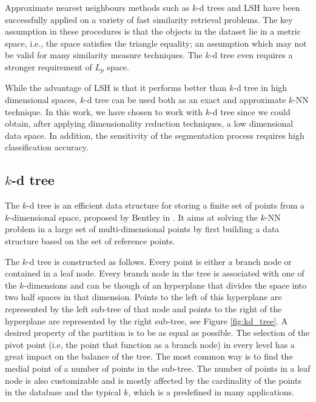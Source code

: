 \iftoggle{edit-mode}{\hspace{0pt}\marginpar{Examples of Exact and Approximate Indexing}}{}
Approximate nearest neighbours methods such as $k$-d trees and LSH have been successfully applied on a variety of fast similarity retrieval problems.
The key assumption in these procedures is that the objects in the dataset lie in a metric space, i.e., the space satisfies the triangle equality; an assumption which may not be valid for many similarity measure techniques.
The $k$-d tree even requires a stronger requirement of $L_p$ space. 

\iftoggle{edit-mode}{\hspace{0pt}\marginpar{This work}}{}
While the advantage of LSH is that it performs better than $k$-d tree in high dimensional spaces, $k$-d tree can be used both as an exact and approximate $k$-NN technique. 
In this work, we have chosen to work with $k$-d tree since we could obtain, after applying dimensionality reduction techniques, a low dimensional data space.
In addition, the sensitivity of the segmentation process requires high classification accuracy.

\subsection{$k$-d tree}
\label{subsec:kd_tree}

\iftoggle{edit-mode}{\hspace{0pt}\hspace{0pt}\marginpar{A short introduction to $k$-d tree}}{} 
The $k$-d tree is an efficient data structure for storing a finite set of points from a $k$-dimensional space, proposed by Bentley in \cite{bentley1975multidimensional}. 
It aims at solving the $k$-NN problem in a large set of multi-dimensional points by first building a data structure based on the set of reference points. 

\iftoggle{edit-mode}{\hspace{0pt}\marginpar{How it works, how the data is saved and extracted}}{} 
The $k$-d tree is constructed as follows. 
Every point is either a branch node or contained in a leaf node. 
Every branch node in the tree is associated with one of the $k$-dimensions and can be though of an hyperplane that divides the space into two half spaces in that dimension. 
Points to the left of this hyperplane are represented by the left sub-tree of that node and points to the right of the hyperplane are represented by the right sub-tree, see Figure \ref{fig:kd_tree}. 
A desired property of the partition is to be as equal as possible. 
The selection of the pivot point (i.e,  the point that function as a branch node) in every level has a great impact on the balance of the tree. 
The most common way is to find the medial point of a number of points in the sub-tree. 
The number of points in a leaf node is also customizable and is mostly affected by the cardinality of the points in the database and the typical $k$, which is a predefined in many applications.

